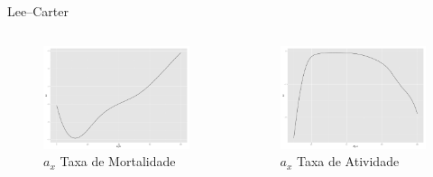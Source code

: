 \documentclass{beamer}
\begin{document}
\begin{frame}{Lee--Carter}
	\begin{columns}[c]
	\column{6cm}
	\begin{figure}
		\caption{$a_{x}$ Taxa de Mortalidade}
		\includegraphics[width=\textwidth]{Graphs/DR_LC_ax.pdf}
	\end{figure}
	\column{6cm}
	\begin{figure}
		\caption{$a_{x}$ Taxa de Atividade}
		\includegraphics[width=\textwidth]{Graphs/LFPR_LC_ax.pdf}
	\end{figure}
	\end{columns}  
\end{frame}
\end{document}
